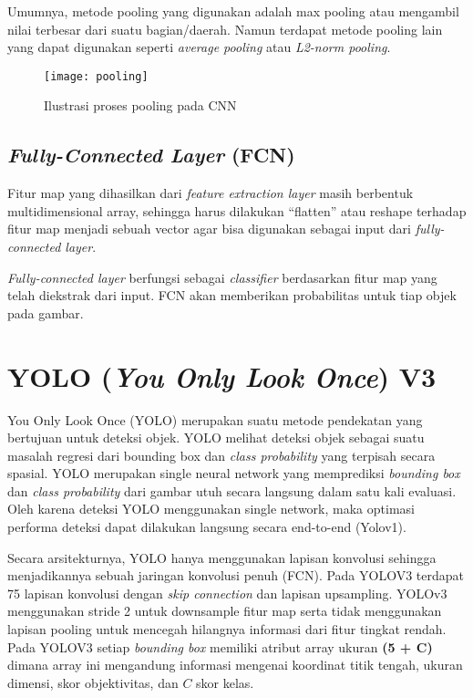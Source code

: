 \documentclass[../thesis.tex]{subfiles}
\begin{document}
Umumnya, metode pooling yang digunakan adalah max pooling atau mengambil nilai terbesar dari suatu bagian/daerah. Namun terdapat metode pooling lain yang dapat digunakan seperti \textit{average pooling} atau
\textit{L2-norm pooling}.
\begin{figure}[b]
	\centering
	\texttt{[image: pooling]}
	\caption{Ilustrasi proses pooling pada CNN}
	\label{pooling_CNN}
\end{figure}

\subsection{\textit{Fully-Connected Layer} (FCN)}
Fitur map yang dihasilkan dari \textit{feature extraction layer} masih berbentuk multidimensional array, sehingga harus dilakukan “flatten” atau reshape terhadap fitur map menjadi sebuah vector agar bisa digunakan sebagai input dari \textit{fully-connected layer}.

\textit{Fully-connected layer} berfungsi sebagai \textit{classifier} berdasarkan fitur map yang telah diekstrak dari input. FCN akan memberikan probabilitas untuk tiap objek pada gambar.

\section{YOLO (\textit{You Only Look Once}) V3}

You Only Look Once (YOLO) merupakan suatu metode pendekatan yang bertujuan untuk deteksi objek. YOLO melihat deteksi objek sebagai suatu masalah regresi dari bounding box dan
\textit{class probability} yang terpisah secara spasial. YOLO merupakan single neural network yang memprediksi \textit{bounding box} dan \textit{class probability} dari gambar utuh secara langsung dalam satu kali
evaluasi. Oleh karena deteksi YOLO menggunakan single network, maka optimasi performa deteksi dapat dilakukan langsung secara end-to-end (Yolov1).

Secara arsitekturnya, YOLO hanya menggunakan lapisan konvolusi sehingga menjadikannya sebuah jaringan konvolusi penuh (FCN). Pada YOLOV3 terdapat 75 lapisan konvolusi dengan \textit{skip connection} dan lapisan upsampling.
YOLOv3 menggunakan stride 2 untuk downsample fitur map serta tidak menggunakan lapisan pooling untuk mencegah hilangnya informasi dari fitur tingkat rendah. Pada YOLOV3 setiap \textit{bounding box} memiliki atribut array ukuran \textbf{(5 + C)} dimana array ini mengandung informasi
mengenai koordinat titik tengah, ukuran dimensi, skor objektivitas, dan $C$ skor kelas.
\end{document}
